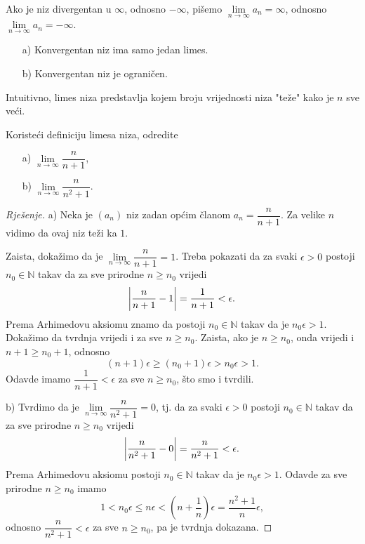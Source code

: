Ako je niz divergentan u $\mathbb{\infty}$, odnosno $-\mathbb{\infty}$, pišemo $\lim\limits_{n\to \infty}{a_n}=\infty$, odnosno $\lim\limits_{n\to \infty}{a_n}=-\infty$.
\begin{remark} \textbf{}
\begin{itemize}
\item[a)] Konvergentan niz ima samo jedan limes.
\item[b)] Konvergentan niz je ograničen.
\end{itemize}
\end{remark}

Intuitivno, limes niza predstavlja kojem broju vrijednosti niza "teže" kako je $n$ sve veći.

\begin{exercise}
Koristeći definiciju limesa niza, odredite
\begin{itemize}
\item[a)] $\lim\limits_{n\to \infty}{\dfrac{n}{n+1}}$,
\item[b)] $\lim\limits_{n\to \infty}{\dfrac{n}{n^2+1}}$.
\end{itemize}
\end{exercise}
\begin{proof}[Rješenje]
a) Neka je $(a_n)$ niz zadan općim članom $a_n=\dfrac{n}{n+1}$. Za velike $n$ vidimo da ovaj niz teži ka $1$. 

Zaista, dokažimo da je $\lim\limits_{n\to \infty}{\dfrac{n}{n+1}}=1$. Treba pokazati da za svaki $\epsilon>0$ postoji $n_0\in \mathbb{N}$ takav da za sve prirodne $n\geq n_0$ vrijedi
$$\abs{\dfrac{n}{n+1}-1}=\dfrac{1}{n+1}<\epsilon.$$ Prema Arhimedovu aksiomu znamo da postoji $n_0\in \mathbb{N}$ takav da je $n_0\epsilon>1$. Dokažimo da tvrdnja vrijedi i za sve $n\geq n_0$. Zaista, ako je $n\geq n_0$, onda vrijedi i $n+1\geq n_0+1$, odnosno $$(n+1)\epsilon\geq(n_0+1)\epsilon>n_0\epsilon>1.$$ 
Odavde imamo $\dfrac{1}{n+1}<\epsilon$ za sve $n\geq n_0$, što smo i tvrdili.

b) Tvrdimo da je $\lim\limits_{n\to \infty}{\dfrac{n}{n^2+1}}=0$, tj. da za svaki $\epsilon>0$ postoji $n_0\in \mathbb{N}$ takav da za sve prirodne $n\geq n_0$ vrijedi
$$\abs{\dfrac{n}{n^2+1}-0}=\dfrac{n}{n^2+1}<\epsilon.$$
Prema Arhimedovu aksiomu postoji $n_0\in \mathbb{N}$ takav da je $n_0\epsilon>1$. Odavde za sve prirodne $n\geq n_0$ imamo
$$1<n_0\epsilon\leq n\epsilon<\left(n+\dfrac{1}{n}\right)\epsilon=\dfrac{n^2+1}{n}\epsilon,$$
odnosno $\dfrac{n}{n^2+1}<\epsilon$ za sve $n\geq n_0$, pa je tvrdnja dokazana.
\end{proof}

